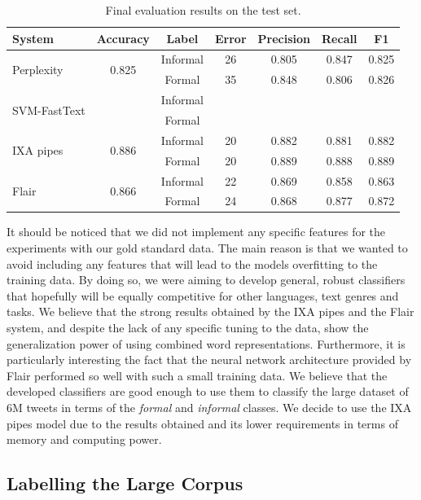 \documentclass[information,article,submit,moreauthors,pdftex,10pt,a4paper]{Definitions/mdpi}
\begin{document}
\begin{table}[H]
  \centering
  \begin{tabular}{lcccccc} \hline
    System & Accuracy & Label & Error & Precision & Recall & F1 \\ \hline \hline
    \multirow{2}{*}{Perplexity} & \multirow{2}{*}{0.825} & Informal & 26 & 0.805 & 0.847 & 0.825 \\
    & & Formal & 35 & 0.848 & 0.806 & 0.826 \\ \hline \hline
    \multirow{2}{*}{SVM-FastText} & \multirow{2}{*}{} & Informal &  &  &  &  \\
    & & Formal & &  &  &  \\ \hline \hline
    \multirow{2}{*}{IXA pipes} & \multirow{2}{*}{0.886} & Informal & 20 & 0.882 & 0.881 & 0.882 \\
    & & Formal & 20 & 0.889 & 0.888 & 0.889 \\ \hline \hline
    \multirow{2}{*}{Flair} & \multirow{2}{*}{0.866} & Informal & 22 & 0.869 & 0.858 & 0.863 \\
    & & Formal & 24 & 0.868 & 0.877 & 0.872 \\ \hline
 \end{tabular}
  \caption{Final evaluation results on the test set.}
  \label{tab:testresults}
\end{table}

It should be noticed that we did not implement any specific features for the experiments with our gold standard data. The main reason is that we wanted to avoid including any features that will lead to the models overfitting to the training data. By doing so, we were aiming to develop general, robust classifiers that hopefully will be equally competitive for other languages, text genres and tasks. We believe that the strong results obtained by the IXA pipes and the Flair system, and despite the lack of any specific tuning to the data, show the generalization power of using combined word representations. Furthermore, it is particularly interesting the fact that the neural network architecture provided by Flair performed so well with such a small training data. We believe that the developed classifiers are good enough to use them to classify the large dataset of 6M tweets in terms of the \emph{formal} and \emph{informal} classes. We decide to use the IXA pipes model due to the results obtained and its lower requirements in terms of memory and computing power.

\subsection{Labelling the Large Corpus}\label{sec:apl}
\end{document}
